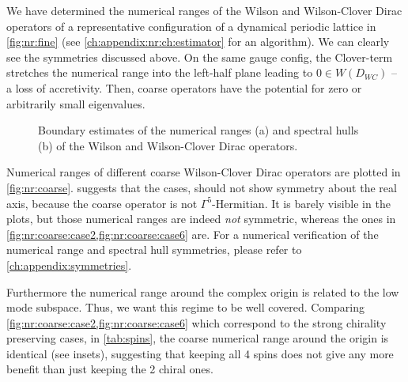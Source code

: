 We have determined the numerical ranges of the Wilson and Wilson-Clover Dirac operators of a representative configuration of a dynamical periodic lattice in \cref{fig:nr:fine} (see \cref{ch:appendix:nr:ch:estimator} for an algorithm).
We can clearly see the symmetries discussed above.
On the same gauge config, the Clover-term stretches the numerical range into the left-half plane leading to $0 \in W(D_{WC})$ -- a loss of accretivity.
Then, coarse operators have the potential for zero or arbitrarily small eigenvalues.

\begin{figure}
\centering

\hfill
{}

\caption{
Boundary estimates of the numerical ranges (a) and spectral hulls (b) of the Wilson and Wilson-Clover Dirac operators.
}
\label{fig:fine}
\end{figure}

Numerical ranges of different coarse Wilson-Clover Dirac operators are plotted in \cref{fig:nr:coarse}.
 suggests that the  cases, should not show symmetry about the real axis, because the coarse operator is not $\Gamma^{5}$-Hermitian.
It is barely visible in the plots, but those numerical ranges are indeed \emph{not} symmetric, whereas the ones in \cref{fig:nr:coarse:case2,fig:nr:coarse:case6} are.
For a numerical verification of the numerical range and spectral hull symmetries, please refer to \cref{ch:appendix:symmetries}.

Furthermore the numerical range around the complex origin is related to the low mode subspace.
Thus, we want this regime to be well covered.
Comparing \cref{fig:nr:coarse:case2,fig:nr:coarse:case6} which correspond to the strong chirality preserving cases,  in \cref{tab:spins}, the coarse numerical range around the origin is identical (see insets), suggesting that keeping all \num{4} spins does not give any more benefit than just keeping the \num{2} chiral ones.


